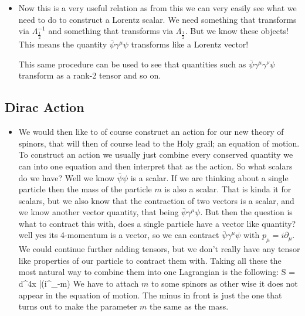 \documentclass[11pt]{article}
\renewenvironment{flalign}{\vspace{-2mm}\empheq[box=\tcbhighmath]{align}}{\endempheq}
\numberwithin{equation}{section}
\begin{document}
\begin{itemize}
   \item 
   Now this is a very useful relation as from this we can very easily see what we need to do to construct a Lorentz scalar. We need something that transforms via $\Lambda_{\frac{1}{2}}^{-1}$ and something that transforms via $\Lambda_{\frac{1}{2}}$. But we know these objects! This means the quantity $\bar{\psi}\gamma^{\mu}\psi$ transforms like a Lorentz vector! 

   This same procedure can be used to see that quantities such as $\bar{\psi}\gamma^{\mu}\gamma^{\nu}\psi$ transform as a rank-2 tensor and so on. 
\end{itemize}
\subsection{Dirac Action}
\begin{itemize}
  \item We would then like to of course construct an action for our new theory of spinors, that will then of course lead to the Holy grail; an equation of motion. To construct an action we usually just combine every conserved quantity we can into one equation and then interpret that as the action. So what scalars do we have? Well we know $\bar{\psi}\psi$ is a scalar. If we are thinking about a single particle then the mass of the particle $m$ is also a scalar. That is kinda it for scalars, but we also know that the contraction of two vectors is a scalar, and we know another vector quantity, that being $\bar{\psi}\gamma^{\mu}\psi$. But then the question is what to contract this with, does a single particle have a vector like quantity? well yes its 4-momentum is a vector, so we can contract $\bar{\psi}\gamma^{\mu}\psi$ with $p_{\mu} = i\partial_{\mu}$. We could continue further adding tensors, but we don't really have any tensor like properties of our particle to contract them with. Taking all these the most natural way to combine them into one Lagrangian is the following:
  \begin{flalign}
  \label{D_act}
    S = \int d^4x \bar{\psi}(i\gamma^{\mu}\partial_{\mu}-m)\psi 
  \end{flalign}
  We have to attach $m$ to some spinors as other wise it does not appear in the equation of motion. The minus in front is just the one that turns out to make the parameter $m$ the same as the mass. 
  

\end{itemize}
\end{document}
